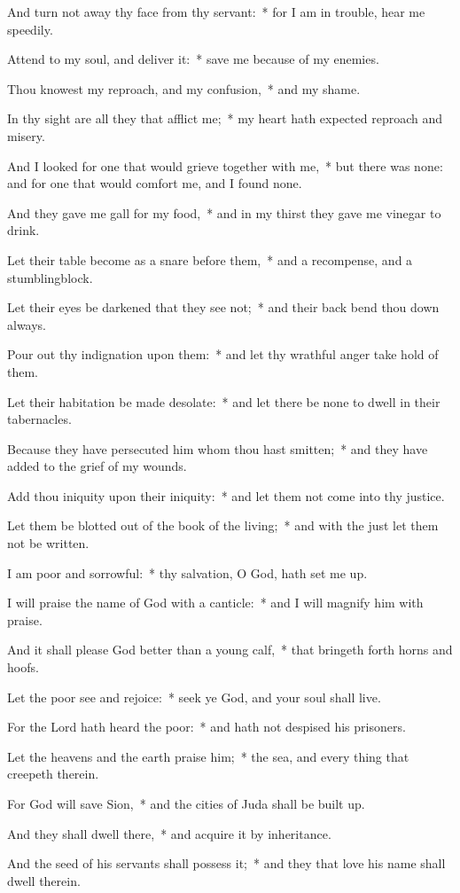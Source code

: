 \begin{enpars}
\item And turn not away thy face from thy servant:~* for I am in trouble, hear me speedily.
\item Attend to my soul, and deliver it:~* save me because of my enemies.
\item Thou knowest my reproach, and my confusion,~* and my shame.
\item In thy sight are all they that afflict me;~* my heart hath expected reproach and misery.
\item And I looked for one that would grieve together with me,~* but there was none: and for one that would comfort me, and I found none.
\item And they gave me gall for my food,~* and in my thirst they gave me vinegar to drink.
\item Let their table become as a snare before them,~* and a recompense, and a stumblingblock.
\item Let their eyes be darkened that they see not;~* and their back bend thou down always.
\item Pour out thy indignation upon them:~* and let thy wrathful anger take hold of them.
\item Let their habitation be made desolate:~* and let there be none to dwell in their tabernacles.
\item Because they have persecuted him whom thou hast smitten;~* and they have added to the grief of my wounds.
\item Add thou iniquity upon their iniquity:~* and let them not come into thy justice.
\item Let them be blotted out of the book of the living;~* and with the just let them not be written.
\item I am poor and sorrowful:~* thy salvation, O God, hath set me up.
\item I will praise the name of God with a canticle:~* and I will magnify him with praise.
\item And it shall please God better than a young calf,~* that bringeth forth horns and hoofs.
\item Let the poor see and rejoice:~* seek ye God, and your soul shall live.
\item For the Lord hath heard the poor:~* and hath not despised his prisoners.
\item Let the heavens and the earth praise him;~* the sea, and every thing that creepeth therein.
\item For God will save Sion,~* and the cities of Juda shall be built up.
\item And they shall dwell there,~* and acquire it by inheritance.
\item And the seed of his servants shall possess it;~* and they that love his name shall dwell therein.
\end{enpars}